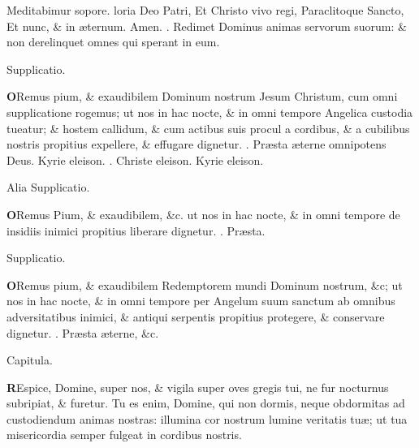 \documentclass[letter,11pt]{book}
\makeatletter
\DeclareRobustCommand{\Vbar}{\vers@resp{-0.1em}{V}}
\DeclareRobustCommand{\Rbar}{\vers@resp{0pt}{R}}
\newcommand{\vers@resp@sym}{\raisebox{0.2ex}{\rotatebox[origin=c]{-20}{$\m@th\rceil$}}}
\newcommand{\vers@resp}[2]{%
  {\ooalign{\hidewidth\kern#1\vers@resp@sym\hidewidth\cr#2\cr}}%
}%
\def\V{\color{Red} \Vbar . \color{black}}
\def\R{\color{Red} \Rbar . \color{black}}
\makeatother
\begin{document}
\begin{multicols*}{2}
\newline \indent Meditabimur sopore.
loria Deo Patri,
\newline \indent Et Christo vivo regi,
\newline \indent Paraclitoque Sancto,
\newline \indent Et nunc, \& in \ae ternum. Amen.
\newline \V Redimet Dominus animas servorum
suorum: \& non derelinquet omnes qui sperant in eum.
\vspace{-.5em} \begin{center} \color{Red} Supplicatio. \end{center} \vspace{-.5em}
\lettrine[lines=2]{\bfseries \color{Red} O}{}Remus pium, \& exaudibilem Dominum nostrum Jesum Christum, cum omni supplicatione rogemus; ut nos in hac nocte, \& in omni tempore Angelica custodia tueatur; \& hostem callidum, \& cum actibus suis procul a cordibus, \& a cubilibus nostris propitius expellere, \& effugare dignetur. \R Pr\ae sta \ae terne omnipotens Deus. Kyrie eleison. \R Christe eleison. Kyrie eleison.
\vspace{-.5em} \begin{center} \color{Red} Alia Supplicatio. \end{center} \vspace{-.5em}
\lettrine[lines=2]{\bfseries \color{Red} O}{}Remus Pium, \& exaudibilem, \&c. ut nos in hac nocte, \& in omni tempore de insidiis inimici propitius liberare dignetur. \R Pr\ae sta.
\vspace{-.5em} \begin{center} \color{Red} Supplicatio. \end{center} \vspace{-.5em}
\lettrine[lines=2]{\bfseries \color{Red} O}{}Remus pium, \& exaudibilem Redemptorem mundi Dominum nostrum, \&c; ut nos in hac nocte, \& in omni tempore per Angelum suum sanctum ab omnibus adversitatibus inimici, \& antiqui serpentis propitius protegere, \& conservare dignetur. \R Pr\ae sta \ae terne, \&c.
\vspace{-.5em} \begin{center} \color{Red} Capitula. \end{center} \vspace{-.5em}
\lettrine[lines=2]{\bfseries \color{Red} R}{}Espice, Domine, super nos, \& vigila super oves gregis tui, ne fur nocturnus subripiat, \& furetur. Tu es enim, Domine, qui non dormis, neque obdormitas ad custodiendum animas nostras: illumina cor nostrum lumine veritatis tu\ae ; ut tua misericordia semper fulgeat in cordibus nostris.

\end{multicols*}
\end{document}
